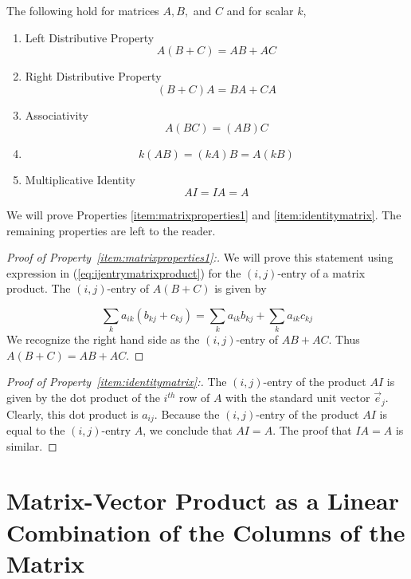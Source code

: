\documentclass{ximera}
\begin{document}
\begin{theorem}\label{th:propertiesofmatrixmultiplication}
The following hold for matrices $A,B,$ and $C$ and for scalar $k$,
\begin{enumerate}
\item \label{item:matrixproperties1} Left Distributive Property
$$A\left( B+C\right) =AB +AC$$
\item\label{item:matrixproperties2} Right Distributive Property
$$\left( B+C\right) A=BA+CA$$
\item \label{item:matrixproperties3} Associativity
$$A\left( BC\right) =\left( AB\right) C$$
\item\label{item:matrixproperties4}
$$k(AB)=(kA)B=A(kB)$$
\item \label{item:identitymatrix} Multiplicative Identity
$$AI=IA=A$$
\end{enumerate}
\end{theorem}
We will prove Properties \ref{item:matrixproperties1} and \ref{item:identitymatrix}.  The remaining properties are left to the reader.
\begin{proof}[Proof of Property~\ref{item:matrixproperties1}:]
We will prove this statement using expression in (\ref{eq:ijentrymatrixproduct}) for the $(i,j)$-entry of a matrix product. The $(i,j)$-entry of $A(B+C)$ is given by

$$
\sum_{k}a_{ik}( b_{kj}+c_{kj})=\sum_{k}a_{ik}b_{kj}+\sum_{k}a_{ik}c_{kj}
$$
We recognize the right hand side as the $(i,j)$-entry of $AB+AC$.
Thus $A(B+C) =AB+AC$. 
\end{proof}
\begin{proof}[Proof of Property~\ref{item:identitymatrix}:]
The $(i,j)$-entry of the product $AI$ is given by the dot product of the $i^{th}$ row of $A$ with the standard unit vector $\vec{e}_j$.  Clearly, this dot product is $a_{ij}$.  Because the $(i,j)$-entry of the product $AI$ is equal to the $(i,j)$-entry $A$, we conclude that $AI=A$.  The proof that $IA=A$ is similar.
\end{proof}

\section*{Matrix-Vector Product as a Linear Combination of the Columns of the Matrix}
\end{document}
